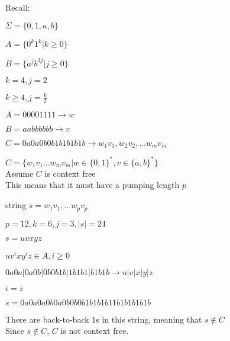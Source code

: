 \documentclass{article}
\begin{document}
Recall:

$\Sigma = \{0, 1, a, b\}$

$A = \{0^k 1^k | k \ge 0\}$

$B = \{a^j b^{3j} | j \ge 0\}$

$k = 4, j = 2$

$k \ge 4, j = \frac{k}{2}$

$A = 00001111 \rightarrow w$

$B = aabbbbbb \rightarrow v$

$C = 0a0a0b0b1b1b1b1b \rightarrow w_1 v_1, w_2 v_2, ... w_m v_m$

$C = \{w_1 v_1 ... w_m v_m | w \in \{0, 1\}^*, v \in \{a, b\}^*\}$
\\
Assume $C$ is context free
\\
This means that it must have a pumping length $p$

string $s = w_1 v_1, ... w_p v_p$

$p = 12, k = 6, j = 3, |s| = 24$

$s = uvxyz$

$u v^i x y^i z \in A, i \ge 0$

$0a0a | 0a0b | 0b0b1b | 1b1b1 | b1b1b \rightarrow u | v | x | y | z$

$i = z$

$s = 0a0a0a0b0a0b0b0b1b1b1b11b1b1b1b1b$

There are back-to-back $1$s in this string, meaning that $s \notin C$
\\
Since $s \notin C$, $C$ is not context free.
\end{document}
